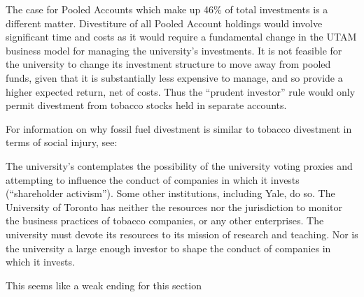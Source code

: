 The case for Pooled Accounts which make up 46\% of total investments is a different matter. 
Divestiture of all Pooled Account holdings would involve significant time and costs as it would require a fundamental change in the UTAM business model for managing the university's investments. 
It is not feasible for the university to change its investment structure to move away from pooled funds, given that it is substantially less expensive to manage, and so provide a higher expected return, net of costs. 
Thus the ``prudent investor'' rule would only permit divestment from tobacco stocks held in separate accounts.



For information on why fossil fuel divestment is similar to tobacco divestment in terms of social injury, see: 




The university's  contemplates the possibility of the university voting proxies and attempting to influence the conduct of companies in which it invests (``shareholder activism'').
Some other institutions, including Yale, do so. 
The University of Toronto has neither the resources nor the jurisdiction to monitor the business practices of tobacco companies, or any other enterprises. 
The university must devote its resources to its mission of research and teaching. 
Nor is the university a large enough investor to shape the conduct of companies in which it invests. 

\begin{vcom}
	This seems like a weak ending for this section
\end{vcom}


